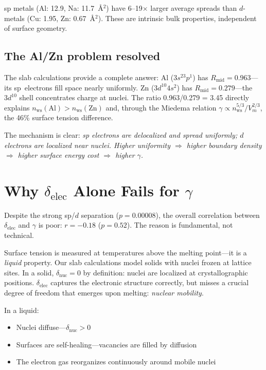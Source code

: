 \documentclass[twocolumn,showpacs,preprintnumbers,amsmath,amssymb,prb]{revtex4-2}
\begin{document}
sp metals (Al: 12.9, Na: 11.7~\AA$^2$) have
6--19$\times$ larger average spreads than $d$-metals
(Cu: 1.95, Zn: 0.67~\AA$^2$).
These are intrinsic bulk properties, independent of
surface geometry.


\subsection{The Al/Zn problem resolved}

The slab calculations provide a complete answer:
Al ($3s^23p^1$) has $R_\mathrm{mid} = 0.963$---its
sp~electrons fill space nearly uniformly.
Zn ($3d^{10}4s^2$) has $R_\mathrm{mid} = 0.279$---the
$3d^{10}$ shell concentrates charge at nuclei.
The ratio 0.963/0.279 = 3.45 directly explains
$n_\mathrm{ws}(\mathrm{Al}) > n_\mathrm{ws}(\mathrm{Zn})$
and, through the Miedema relation
$\gamma \propto n_\mathrm{ws}^{5/3}/V_m^{2/3}$,
the 46\% surface tension difference.

The mechanism is clear:
\emph{sp electrons are delocalized and spread uniformly;
$d$ electrons are localized near nuclei.
Higher uniformity $\Rightarrow$ higher boundary density
$\Rightarrow$ higher surface energy cost $\Rightarrow$
higher $\gamma$.}



\section{Why $\delta_\mathrm{elec}$ Alone Fails for $\gamma$}
\label{sec:transition}

Despite the strong sp/$d$ separation ($p = 0.00008$),
the overall correlation between $\delta_\mathrm{elec}$ and
$\gamma$ is poor: $r = -0.18$ ($p = 0.52$).
The reason is fundamental, not technical.

Surface tension is measured at temperatures above the
melting point---it is a \emph{liquid} property.
Our slab calculations model solids with nuclei frozen at
lattice sites.
In a solid, $\delta_\mathrm{nuc} = 0$ by definition:
nuclei are localized at crystallographic positions.
$\delta_\mathrm{elec}$ captures the electronic structure
correctly, but misses a crucial degree of freedom that
emerges upon melting: \emph{nuclear mobility}.

In a liquid:
\begin{itemize}
  \item Nuclei diffuse---$\delta_\mathrm{nuc} > 0$
  \item Surfaces are self-healing---vacancies are filled
        by diffusion
  \item The electron gas reorganizes continuously around
        mobile nuclei
\end{itemize}
\end{document}
